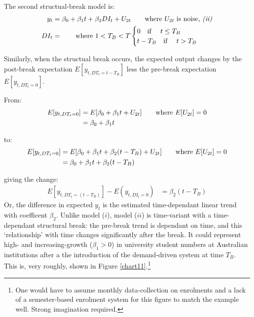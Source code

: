 \documentclass{article}\usepackage[]{graphicx}\usepackage[]{color}
\begin{document}
    \vspace{5mm}

    The second structual-break model is:
        \begin{align*} 
        y_t  &= \beta_{0} + \beta_{1} t + \beta_{2} DI_{t} + U_{2t}    \tag*{where $U_{2t}$ is noise, \textit{(ii)}} \\ 
        DI_t &=                                      \tag*{where $1< T_B <T$}
        \begin{cases}
          0 \text{\quad  if \quad}         t \leq T_B \\
          t - T_{B} \text{\quad  if \quad} t >    T_B
        \end{cases}
      \end{align*}

    Similarly, when the structual break occurs, the expected output changes by the post-break expectation $E[y_{t,DT_{t}=t-T_B}]$ less the pre-break expectation $E[y_{t,DT_{t}=0}]$.

    From:
        \begin{align*}
          E[y_{t,DT_{t}=0}] &= E[\beta_0 +   \beta_1 t + U_{2t}]    \tag*{where $E[U_{2t}]=0$} \\ 
                            &= \beta_0 + \beta_1 t
        \end{align*}

    to:
        \begin{align*}
          E[y_{t,DT_{t}=0}] &= E[\beta_0 + \beta_1 t + \beta_2 (t - T_{B}) + U_{2t}]    \tag*{where $E[U_{2t}]=0$} \\ 
                            &= \beta_0 + \beta_1 t + \beta_2 (t - T_{B}) \\ 
        \end{align*}

    giving the change:
        \begin{align*}
          E[y_{t,DT_{t}=(t-T_{B})}] - E(y_{t,DI_{t}=0}) &= \beta_2 (t - T_{B})
        \end{align*}
    Or, the difference in expected $y_t$ is the estimated time-dependant linear trend with coefficent $\beta_2$. Unlike model ($i$), model ($ii$) is time-variant with a time-dependant structural break: the pre-break trend is dependant on time, and this `relationship' with time changes significantly after the break. It could represent high- and increasing-growth ($\beta_{1}>0$) in university student numbers at Australian institutions after a the introduction of the demand-driven system at time $T_B$. This is, very roughly, shown in Figure \ref{chart11}.\footnote{One would have to assume monthly data-collection on enrolments and a lack of a semester-based enrolment system for this figure to match the example well. Strong imagination required.}
\end{document}
